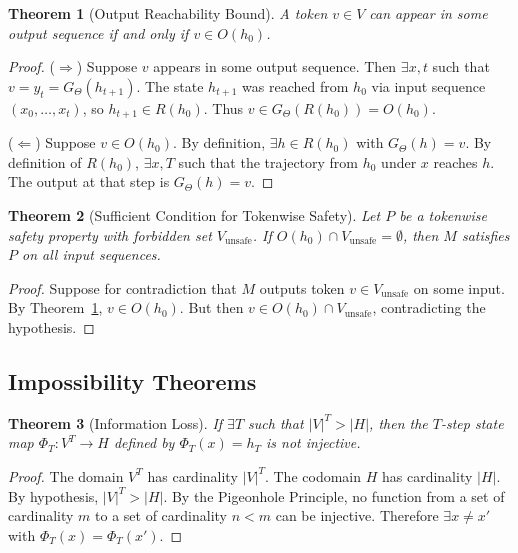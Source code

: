 \documentclass[11pt,a4paper]{article}
\newtheorem{theorem}{Theorem}[section]
\begin{document}
\begin{theorem}[Output Reachability Bound]
\label{thm:output-reach}
A token $v \in V$ can appear in some output sequence if and only if $v \in O(h_0)$.
\end{theorem}

\begin{proof}
($\Rightarrow$) Suppose $v$ appears in some output sequence. Then $\exists x, t$ such that $v = y_t = G_\Theta(h_{t+1})$. The state $h_{t+1}$ was reached from $h_0$ via input sequence $(x_0, \ldots, x_t)$, so $h_{t+1} \in R(h_0)$. Thus $v \in G_\Theta(R(h_0)) = O(h_0)$.

($\Leftarrow$) Suppose $v \in O(h_0)$. By definition, $\exists h \in R(h_0)$ with $G_\Theta(h) = v$. By definition of $R(h_0)$, $\exists x, T$ such that the trajectory from $h_0$ under $x$ reaches $h$. The output at that step is $G_\Theta(h) = v$.
\end{proof}

\begin{theorem}[Sufficient Condition for Tokenwise Safety]
\label{thm:tokenwise-safety}
Let $P$ be a tokenwise safety property with forbidden set $V_{\text{unsafe}}$. If $O(h_0) \cap V_{\text{unsafe}} = \emptyset$, then $M$ satisfies $P$ on all input sequences.
\end{theorem}

\begin{proof}
Suppose for contradiction that $M$ outputs token $v \in V_{\text{unsafe}}$ on some input. By Theorem~\ref{thm:output-reach}, $v \in O(h_0)$. But then $v \in O(h_0) \cap V_{\text{unsafe}}$, contradicting the hypothesis.
\end{proof}

\subsection{Impossibility Theorems}

\begin{theorem}[Information Loss]
\label{thm:info-loss}
If $\exists T$ such that $|V|^T > |H|$, then the $T$-step state map $\Phi_T: V^T \to H$ defined by $\Phi_T(x) = h_T$ is not injective.
\end{theorem}

\begin{proof}
The domain $V^T$ has cardinality $|V|^T$. The codomain $H$ has cardinality $|H|$. By hypothesis, $|V|^T > |H|$. By the Pigeonhole Principle, no function from a set of cardinality $m$ to a set of cardinality $n < m$ can be injective. Therefore $\exists x \neq x'$ with $\Phi_T(x) = \Phi_T(x')$.
\end{proof}
\end{document}

